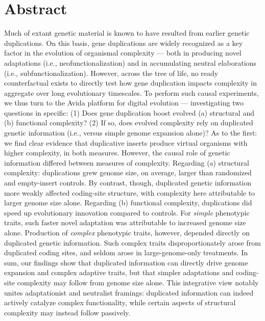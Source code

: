 \section*{Abstract}
Much of extant genetic material is known to have resulted from earlier genetic duplications.
On this basis, gene duplications are widely recognized as a key factor in the evolution of organismal complexity --- both in producing novel adaptations (i.e., neofunctionalization) and in accumulating neutral elaborations (i.e., subfunctionalization).
However, across the tree of life, no ready counterfactual exists to directly test how gene duplication impacts complexity in aggregate over long evolutionary timescales.
To perform such causal experiments, we thus turn to the Avida platform for digital evolution --- investigating two questions in specific:
(1) Does gene duplication boost evolved (a) structural and (b) functional complexity?
(2) If so, does evolved complexity rely on duplicated genetic information (i.e., versus simple genome expansion alone)?
As to the first: we find clear evidence that duplicative inserts produce virtual organisms with higher complexity, in both measures.
However, the causal role of genetic information differed between measures of complexity.
Regarding (a) structural complexity: duplications grew genome size, on average, larger than randomized and empty-insert controls.
By contrast, though, duplicated genetic information more weakly affected coding-site structure, with complexity here attributable to larger genome size alone.
Regarding (b) functional complexity, duplications did speed up evolutionary innovation compared to controls.
For \textit{simple} phenotypic traits, such faster novel adaptation was attributable to increased genome size alone.
Production of \textit{complex} phenotypic traits, however, depended directly on duplicated genetic information.
Such complex traits disproportionately arose from duplicated coding sites, and seldom arose in large-genome-only treatments.
In sum, our findings show that duplicated information can directly drive genome expansion and complex adaptive traits, but that simpler adaptations and coding-site complexity may follow from genome size alone.
This integrative view notably unites adaptationist and neutralist framings: duplicated information can indeed actively catalyze complex functionality, while certain aspects of structural complexity may instead follow passively.
